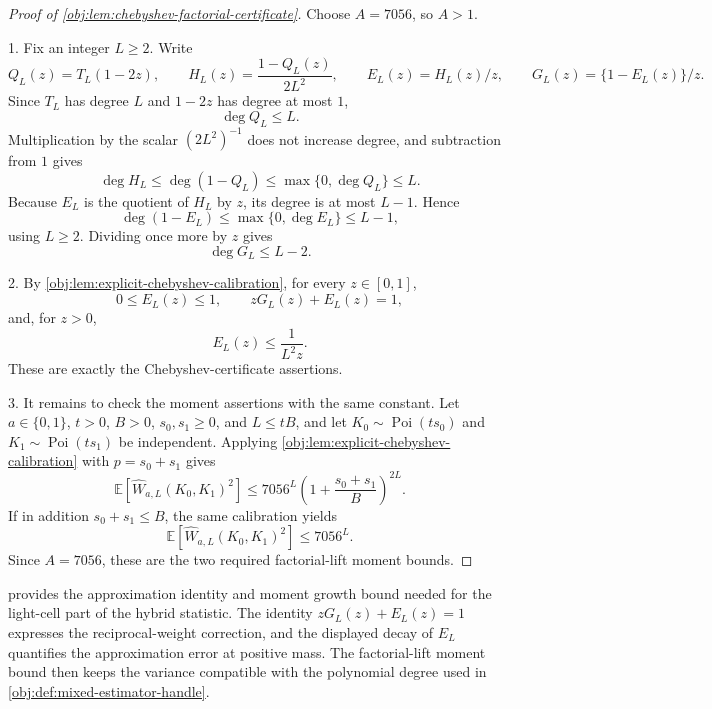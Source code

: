 \documentclass[11pt]{article}
\begin{document}
\begin{proof}[Proof of \cref{obj:lem:chebyshev-factorial-certificate}]
Choose \(A=7056\), so \(A>1\).

1. Fix an integer \(L\ge2\).  Write
\[
Q_L(z)=T_L(1-2z),
\qquad
H_L(z)=\frac{1-Q_L(z)}{2L^2},
\qquad
E_L(z)=H_L(z)/z,
\qquad
G_L(z)=\{1-E_L(z)\}/z .
\]
Since \(T_L\) has degree \(L\) and \(1-2z\) has degree at most \(1\),
\[
\deg Q_L\le L .
\]
Multiplication by the scalar \((2L^2)^{-1}\) does not increase degree, and subtraction from \(1\) gives
\[
\deg H_L
\le \deg(1-Q_L)
\le \max\{0,\deg Q_L\}
\le L .
\]
Because \(E_L\) is the quotient of \(H_L\) by \(z\), its degree is at most \(L-1\).  Hence
\[
\deg(1-E_L)\le \max\{0,\deg E_L\}\le L-1,
\]
using \(L\ge2\).  Dividing once more by \(z\) gives
\[
\deg G_L\le L-2 .
\]

2. By \cref{obj:lem:explicit-chebyshev-calibration}, for every \(z\in[0,1]\),
\[
0\le E_L(z)\le1,
\qquad
zG_L(z)+E_L(z)=1,
\]
and, for \(z>0\),
\[
E_L(z)\le \frac{1}{L^2z}.
\]
These are exactly the Chebyshev-certificate assertions. 

3. It remains to check the moment assertions with the same constant.  Let
\(a\in\{0,1\}\), \(t>0\), \(B>0\), \(s_0,s_1\ge0\), and \(L\le tB\), and let
\(K_0\sim\operatorname{Poi}(ts_0)\) and \(K_1\sim\operatorname{Poi}(ts_1)\) be independent.  Applying \cref{obj:lem:explicit-chebyshev-calibration} with \(p=s_0+s_1\) gives
\[
\mathbb E\!\left[\widehat W_{a,L}(K_0,K_1)^2\right]
\le
7056^L\left(1+\frac{s_0+s_1}{B}\right)^{2L}.
\]
If in addition \(s_0+s_1\le B\), the same calibration yields
\[
\mathbb E\!\left[\widehat W_{a,L}(K_0,K_1)^2\right]
\le
7056^L .
\]
Since \(A=7056\), these are the two required factorial-lift moment bounds. 
\end{proof}

 provides the approximation identity and moment growth bound needed for the light-cell part of the hybrid statistic. The identity \(zG_L(z)+E_L(z)=1\) expresses the reciprocal-weight correction, and the displayed decay of \(E_L\) quantifies the approximation error at positive mass. The factorial-lift moment bound then keeps the variance compatible with the polynomial degree used in \cref{obj:def:mixed-estimator-handle}.
\end{document}
